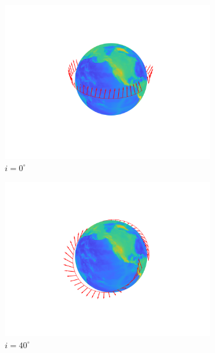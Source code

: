 \begin{figure}
	\centering
	\begin{subfigure}[b]{0.28\textwidth}
		\includegraphics[trim={4.5cm 2.5cm 4cm 2.5cm},clip,width=1\textwidth]{figures/attEst-sim3-mag_0.png}
		\caption{$i=0^\circ$}
	\end{subfigure} \hspace{0.04\textwidth}
	\begin{subfigure}[b]{0.28\textwidth}
		\includegraphics[trim={4.5cm 2.5cm 4cm 2.5cm},clip,width=1\textwidth]{figures/attEst-sim3-mag_40.png}
		\caption{$i=40^\circ$}
	\end{subfigure} \hspace{0.04\textwidth}
	\begin{subfigure}[b]{0.28\textwidth}

\end{subfigure}
\end{figure}
